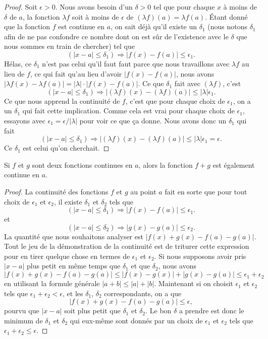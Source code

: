 \begin{proof}
Soit $\epsilon>0$. Nous avons besoin d'un $\delta>0$ tel que pour chaque $x$ à moins de $\delta$ de $a$, la fonction $\lambda f$ soit à moins de $\epsilon$ de $(\lambda f)(a)=\lambda f(a)$. Étant donné que la fonction $f$ est continue en $a$, on sait déjà qu'il existe un $\delta_1$ (nous notons $\delta_1$ afin de ne pas confondre ce nombre dont on est sûr de l'existence avec le $\delta$ que nous sommes en train de chercher) tel que 
\[ 
  (| x-a |\leq \delta_1)\Rightarrow | f(x)-f(a) |\leq \epsilon_1.
\]
Hélas, ce $\delta_1$ n'est pas celui qu'il faut faut parce que nous travaillons avec $\lambda f$ au lieu de $f$, ce qui fait qu'au lieu d'avoir $| f(x)-f(a) |$, nous avons $| \lambda f(x)-\lambda f(a) |=| \lambda |\cdot | f(x)-f(a) |$.  Ce que $\delta_1$ fait avec $(\lambda f)$, c'est
\[ 
  (| x-a |\leq\delta_1)\Rightarrow  | (\lambda f)(x)- (\lambda f)(a)|\leq | \lambda |\epsilon_1.
\]
Ce que nous apprend la continuité de $f$, c'est que pour chaque choix de $\epsilon_1$, on a un $\delta_1$ qui fait cette implication. Comme cela est vrai pour chaque choix de $\epsilon_1$, essayons avec $\epsilon_1=\epsilon/| \lambda |$ pour voir ce que ça donne. Nous avons donc un $\delta_1$ qui fait
\[ 
  (| x-a |\leq\delta_1)\Rightarrow  | (\lambda f)(x)- (\lambda f)(a)|\leq | \lambda |\epsilon_1=\epsilon.
\]
Ce $\delta_1$ est celui qu'on cherchait. 
\end{proof}

\begin{theorem}
Si $f$ et $g$ sont deux fonctions continues en $a$, alors la fonction $f+g$ est également continue en $a$.
\end{theorem}

\begin{proof}
La continuité des fonctions $f$ et $g$ au point $a$ fait en sorte que pour tout choix de $\epsilon_1$ et $\epsilon_2$, il existe $\delta_1$ et $\delta_2$ tels que 
\[ 
  (| x-a |\leq \delta_1)\Rightarrow | f(x)-f(a) |\leq \epsilon_1.
\]
et
\[ 
  (| x-a |\leq \delta_2)\Rightarrow | g(x)-g(a) |\leq \epsilon_2.
\]
La quantité que nous souhaitons analyser est $| f(x)+g(x)-f(a)-g(a) |$. Tout le jeu de la démonstration de la continuité est de triturer cette expression pour en tirer quelque chose en termes de $\epsilon_1$ et $\epsilon_2$. Si nous supposons avoir pris $| x-a |$ plus petit en même temps que $\delta_1$ et que $\delta_2$, nous avons
\[
| f(x)+g(x)-f(a)-g(a) |\leq| f(x)-g(x) |+| g(x)-g(a) |\leq\epsilon_1+\epsilon_2 
\]
en utilisant la formule générale $| a+b |\leq | a |+| b |$. Maintenant si on choisit $\epsilon_1$ et $\epsilon_2$ tels que $\epsilon_1+\epsilon_2<\epsilon$, et les $\delta_1$, $\delta_2$ correspondants, on a que 
\[
| f(x)+g(x)-f(a)-g(a) |\leq\epsilon,
\]
pourvu que $| x-a |$ soit plus petit que $\delta_1$ et $\delta_2$. Le bon $\delta$ a prendre est donc le minimum de $\delta_1$ et $\delta_2$ qui eux-même sont donnés par un choix de $\epsilon_1$ et $\epsilon_2$ tels que $\epsilon_1+\epsilon_2\leq\epsilon$.
\end{proof}

